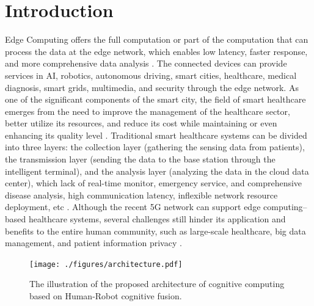 \documentclass[letterpaper]{article} %
\begin{document}
\section{Introduction}

Edge Computing offers the full computation or part of the computation that can process the data at the edge network, which enables low latency, faster response, and more comprehensive data analysis \cite{khan2019edge}. The connected devices can provide services in AI, robotics, autonomous driving, smart cities, healthcare, medical diagnosis, smart grids, multimedia, and security through the edge network. As one of the significant components of the smart city, the field of smart healthcare emerges from the need to improve the management of the healthcare sector, better utilize its resources, and reduce its cost while maintaining or even enhancing its quality level \cite{oueida2018edge}. Traditional smart healthcare systems can be divided into three layers: the collection layer (gathering the sensing data from patients), the transmission layer (sending the data to the base station through the intelligent terminal), and the analysis layer (analyzing the data in the cloud data center), which lack of real-time monitor, emergency service, and comprehensive disease analysis, high communication latency, inflexible network resource deployment, etc \cite{chen2018edge}. Although the recent 5G network can support edge computing–based healthcare systems, several challenges still hinder its application and benefits to the entire human community, such as large-scale healthcare, big data management, and patient information privacy \cite{hartmann2022edge}.

\begin{figure}[t]
    \centering
    \texttt{[image: ./figures/architecture.pdf]}
    \caption{The illustration of the proposed architecture of cognitive computing based on Human-Robot cognitive fusion.}
    \label{fig:cognitive_computing_arch}
\end{figure}
\end{document}
